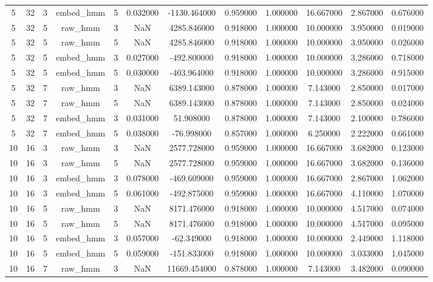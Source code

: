\begin{table}[htbp]
\begin{tabular}{cccccccccc}
5 & 32 & 3 & embed_hmm & 5 & 0.032000 & -1130.464000 & 0.959000 & 1.000000 & 16.667000 & 2.867000 & 0.676000 \\
5 & 32 & 5 & raw_hmm & 3 & NaN & 4285.846000 & 0.918000 & 1.000000 & 10.000000 & 3.950000 & 0.019000 \\
5 & 32 & 5 & raw_hmm & 5 & NaN & 4285.846000 & 0.918000 & 1.000000 & 10.000000 & 3.950000 & 0.026000 \\
5 & 32 & 5 & embed_hmm & 3 & 0.027000 & -492.800000 & 0.918000 & 1.000000 & 10.000000 & 3.286000 & 0.718000 \\
5 & 32 & 5 & embed_hmm & 5 & 0.030000 & -403.964000 & 0.918000 & 1.000000 & 10.000000 & 3.286000 & 0.915000 \\
5 & 32 & 7 & raw_hmm & 3 & NaN & 6389.143000 & 0.878000 & 1.000000 & 7.143000 & 2.850000 & 0.017000 \\
5 & 32 & 7 & raw_hmm & 5 & NaN & 6389.143000 & 0.878000 & 1.000000 & 7.143000 & 2.850000 & 0.024000 \\
5 & 32 & 7 & embed_hmm & 3 & 0.031000 & 51.908000 & 0.878000 & 1.000000 & 7.143000 & 2.100000 & 0.786000 \\
5 & 32 & 7 & embed_hmm & 5 & 0.038000 & -76.998000 & 0.857000 & 1.000000 & 6.250000 & 2.222000 & 0.661000 \\
10 & 16 & 3 & raw_hmm & 3 & NaN & 2577.728000 & 0.959000 & 1.000000 & 16.667000 & 3.682000 & 0.123000 \\
10 & 16 & 3 & raw_hmm & 5 & NaN & 2577.728000 & 0.959000 & 1.000000 & 16.667000 & 3.682000 & 0.136000 \\
10 & 16 & 3 & embed_hmm & 3 & 0.078000 & -469.609000 & 0.959000 & 1.000000 & 16.667000 & 2.867000 & 1.062000 \\
10 & 16 & 3 & embed_hmm & 5 & 0.061000 & -492.875000 & 0.959000 & 1.000000 & 16.667000 & 4.110000 & 1.070000 \\
10 & 16 & 5 & raw_hmm & 3 & NaN & 8171.476000 & 0.918000 & 1.000000 & 10.000000 & 4.517000 & 0.074000 \\
10 & 16 & 5 & raw_hmm & 5 & NaN & 8171.476000 & 0.918000 & 1.000000 & 10.000000 & 4.517000 & 0.095000 \\
10 & 16 & 5 & embed_hmm & 3 & 0.057000 & -62.349000 & 0.918000 & 1.000000 & 10.000000 & 2.449000 & 1.118000 \\
10 & 16 & 5 & embed_hmm & 5 & 0.059000 & -151.833000 & 0.918000 & 1.000000 & 10.000000 & 3.033000 & 1.045000 \\
10 & 16 & 7 & raw_hmm & 3 & NaN & 11669.454000 & 0.878000 & 1.000000 & 7.143000 & 3.482000 & 0.090000 \\

\end{tabular}
\end{table}
